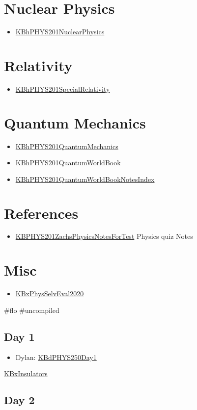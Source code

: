 \documentclass[letterpaper]{article}
\begin{document}
\section{Nuclear Physics}
\label{sec:orgeb4126a}
\begin{itemize}
\item \href{KBhPHYS201NuclearPhysics.org}{KBhPHYS201NuclearPhysics}
\end{itemize}

\section{Relativity}
\label{sec:orgdbfb627}
\begin{itemize}
\item \href{KBhPHYS201SpecialRelativity.org}{KBhPHYS201SpecialRelativity}
\end{itemize}

\section{Quantum Mechanics}
\label{sec:org1bb0964}
\begin{itemize}
\item \href{KBhPHYS201QuantumMechanics.org}{KBhPHYS201QuantumMechanics}
\item \href{KBhPHYS201QuantumWorldBook.org}{KBhPHYS201QuantumWorldBook}
\item \href{KBhPHYS201QuantumWorldBookNotesIndex.org}{KBhPHYS201QuantumWorldBookNotesIndex}
\end{itemize}

\section{References}
\label{sec:org46229be}
\begin{itemize}
\item \href{KBPHYS201ZachsPhysicsNotesForTest.org}{KBPHYS201ZachsPhysicsNotesForTest}
Physics quiz Notes
\end{itemize}

\section{Misc}
\label{sec:org67e990d}
\begin{itemize}
\item \href{KBxPhysSelvEval2020.org}{KBxPhysSelvEval2020}
\end{itemize}

\#flo \#uncompiled

\subsection{Day 1}
\label{sec:org8668aef}
\begin{itemize}
\item Dylan: \href{KBdPHYS250Day1.org}{KBdPHYS250Day1}
\end{itemize}

\href{KBxInsulators.org}{KBxInsulators}

\subsection{Day 2}
\label{sec:orgdbed887}
\end{document}
